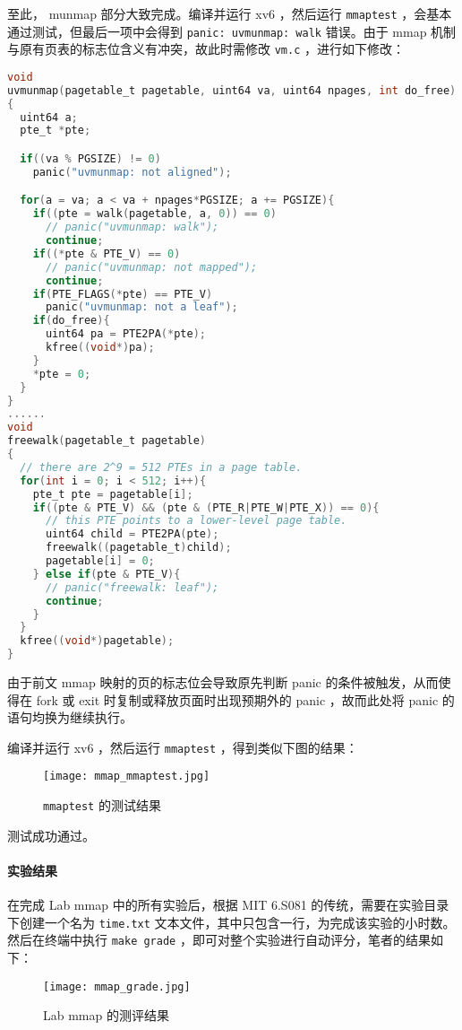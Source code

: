 至此， munmap 部分大致完成。编译并运行 xv6 ，然后运行 \lstinline{mmaptest} ，会基本通过测试，但最后一项中会得到 \lstinline{panic: uvmunmap: walk} 错误。由于 mmap 机制与原有页表的标志位含义有冲突，故此时需修改 \lstinline{vm.c} ，进行如下修改：
\begin{lstlisting}[language=C]
void
uvmunmap(pagetable_t pagetable, uint64 va, uint64 npages, int do_free)
{
  uint64 a;
  pte_t *pte;

  if((va % PGSIZE) != 0)
    panic("uvmunmap: not aligned");

  for(a = va; a < va + npages*PGSIZE; a += PGSIZE){
    if((pte = walk(pagetable, a, 0)) == 0)
      // panic("uvmunmap: walk");
      continue;
    if((*pte & PTE_V) == 0)
      // panic("uvmunmap: not mapped");
      continue;
    if(PTE_FLAGS(*pte) == PTE_V)
      panic("uvmunmap: not a leaf");
    if(do_free){
      uint64 pa = PTE2PA(*pte);
      kfree((void*)pa);
    }
    *pte = 0;
  }
}
......
void
freewalk(pagetable_t pagetable)
{
  // there are 2^9 = 512 PTEs in a page table.
  for(int i = 0; i < 512; i++){
    pte_t pte = pagetable[i];
    if((pte & PTE_V) && (pte & (PTE_R|PTE_W|PTE_X)) == 0){
      // this PTE points to a lower-level page table.
      uint64 child = PTE2PA(pte);
      freewalk((pagetable_t)child);
      pagetable[i] = 0;
    } else if(pte & PTE_V){
      // panic("freewalk: leaf");
      continue;
    }
  }
  kfree((void*)pagetable);
}
\end{lstlisting}

\begin{theorem}
    由于前文 mmap 映射的页的标志位会导致原先判断 panic 的条件被触发，从而使得在 fork 或 exit 时复制或释放页面时出现预期外的 panic ，故而此处将 panic 的语句均换为继续执行。
\end{theorem}

编译并运行 xv6 ，然后运行 \lstinline{mmaptest} ，得到类似下图的结果：
\begin{figure}[H]
  \centering
  \texttt{[image: mmap\_mmaptest.jpg]}
  \caption{ \lstinline{mmaptest} 的测试结果}
\end{figure}

测试成功通过。

\paragraph*{实验结果} 在完成 Lab mmap 中的所有实验后，根据 MIT 6.S081 的传统，需要在实验目录下创建一个名为 \lstinline{time.txt} 文本文件，其中只包含一行，为完成该实验的小时数。然后在终端中执行 \lstinline{make grade} ，即可对整个实验进行自动评分，笔者的结果如下：
\begin{figure}[H]
  \centering
  \texttt{[image: mmap\_grade.jpg]}
  \caption{ Lab mmap 的测评结果}
\end{figure}

